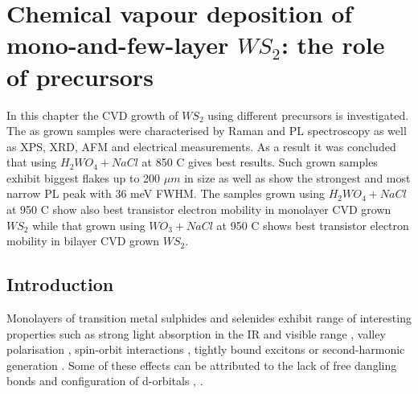 \chapter{Chemical vapour deposition of mono-and-few-layer $WS_2$: the role of precursors}
\label{cha:WS2}

In this chapter the CVD growth of $WS_2$ using different precursors is investigated. The as grown samples were characterised by Raman and PL spectroscopy as well as XPS, XRD, AFM and electrical measurements. As a result it was concluded that using $H_2WO_4 + NaCl$ at 850 {\degree}C gives best results. Such grown samples exhibit biggest flakes up to 200 $\mu m$ in size as well as show the strongest and most narrow PL peak with 36 meV FWHM. The samples grown using $H_2WO_4 + NaCl$ at 950 {\degree}C show also best transistor electron mobility in monolayer CVD grown $WS_2$ while that grown using $WO_3 + NaCl$ at 950 {\degree}C shows best transistor electron mobility in bilayer CVD grown $WS_2$. 

\section{Introduction}
\label{cha:Transfer}
	
Monolayers of transition metal sulphides and selenides exhibit range of interesting properties such as strong light absorption in the IR and visible range \cite{AtomicallyThinMoS2ANewDirect-GapSemiconductor}\cite{ExtraordinarySunlightAbsorptionAndOneNanometerThickPhotovoltaicsUsingTwo-DimensionalMonolayerMaterials}\cite{EvolutionOfElectronicStructureInAtomicallyThinSheetsOfWS2AndWSe2}, valley polarisation \cite{ControlOfValleyPolarizationInMonolayerMoS2ByOpticalHelicity} \cite{ValleyPolarizationInMoS2MonolayersByOpticalPumping}, spin-orbit interactions \cite{CoupledSpinAndValleyPhysicsInMonolayersOfMoS2AndOtherGroup-VIDichalcogenides}\cite{GiantSpin-orbit-inducedSpinSplittingInTwo-dimensionalTransition-metalDichalcogenideSemiconductors}, tightly bound excitons \cite{Mak2012} or second-harmonic generation \cite{ProbingSymmetryPropertiesOfFew-LayerMoS2Andh-BNByOpticalSecond-HarmonicGeneration}. Some of these effects can be attributed to the lack of free dangling bonds and configuration of d-orbitals \cite{TheTransitionMetalDichalcogenidesDiscussionAndInterpretationOfTheObservedOpticalElectricalAndStructuralProperties}, \cite{ElectronicPropertiesOfMoS2Nanoparticles}.

